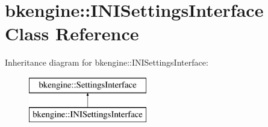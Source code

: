 \hypertarget{classbkengine_1_1INISettingsInterface}{}\section{bkengine\+:\+:I\+N\+I\+Settings\+Interface Class Reference}
\label{classbkengine_1_1INISettingsInterface}
Inheritance diagram for bkengine\+:\+:I\+N\+I\+Settings\+Interface\+:\begin{figure}[H]
\begin{center}
\leavevmode
\includegraphics[height=2.000000cm]{classbkengine_1_1INISettingsInterface}
\end{center}
\end{figure}
